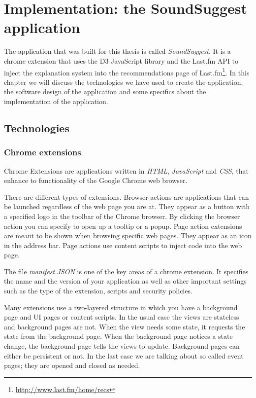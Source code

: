 \chapter{Implementation: the SoundSuggest application}\label{chapter:implementation}

The application that was built for this thesis is called \emph{SoundSuggest}. It is a chrome extension that uses the D3 JavaScript library and the Last.fm API to inject the explanation system into the recommendations page of Last.fm\footnote{\url{http://www.last.fm/home/recs}}. In this chapter we will discuss the technologies we have used to create the application, the software design of the application and some specifics about the implementation of the application.


\section{Technologies}\label{chapter:implementation:section:technologies}

\subsection{Chrome extensions}\label{chapter:implementation:section:technologies:subsection:chrome}

Chrome Extensions are applications written in \emph{HTML}, \emph{JavaScript} and \emph{CSS}, that enhance to functionality of the Google Chrome web browser\cite{google:2012:extensions}.

There are different types of extensions. Browser actions are applications that can be launched regardless of the web page you are at. They appear as a button with a specified logo in the toolbar of the Chrome browser. By clicking the browser action you can specify to open up a tooltip or a popup\cite{google:2012:browseraction}. Page action extensions are meant to be shown when browsing specific web pages. They appear as an icon in the address bar. Page actions use content scripts to inject code into the web page\cite{google:2012:overview}.

The file \emph{manifest.JSON} is one of the key areas of a chrome extension. It specifies the name and the version of your application as well as other important settings such as the type of the extension, scripts and security policies\cite{google:2012:manifest}.

Many extensions use a two-layered structure in which you have a background page and UI pages or content scripts\cite{google:2012:overview}. In the usual case the views are stateless and background pages are not. When the view needs some state, it requests the state from the background page. When the background page notices a state change, the background page tells the views to update\cite{google:2012:background}. Background pages can either be persistent or not. In the last case we are talking about so called event pages; they are opened and closed as needed\cite{google:2012:overview}.

